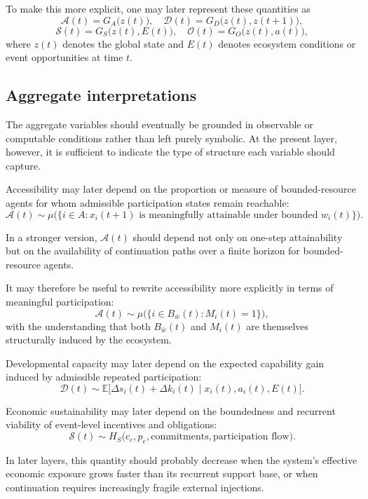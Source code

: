 \documentclass[11pt]{article}
\begin{document}
To make this more explicit, one may later represent these quantities as
\[
\mathcal{A}(t) = G_A\big(z(t)\big), \quad
\mathcal{D}(t) = G_D\big(z(t), z(t+1)\big),
\]
\[
\mathcal{S}(t) = G_S\big(z(t), E(t)\big), \quad
\mathcal{O}(t) = G_O\big(z(t), a(t)\big),
\]
where \(z(t)\) denotes the global state and \(E(t)\) denotes ecosystem conditions or event opportunities at time \(t\).

\subsection{Aggregate interpretations}

The aggregate variables should eventually be grounded in observable or computable conditions rather than left purely symbolic. At the present layer, however, it is sufficient to indicate the type of structure each variable should capture.

Accessibility may later depend on the proportion or measure of bounded-resource agents for whom admissible participation states remain reachable:
\[
\mathcal{A}(t) \sim \mu\big(\{i \in A : x_i(t+1) \text{ is meaningfully attainable under bounded } w_i(t)\}\big).
\]

In a stronger version, \(\mathcal{A}(t)\) should depend not only on one-step attainability but on the availability of continuation paths over a finite horizon for bounded-resource agents.

It may therefore be useful to rewrite accessibility more explicitly in terms of meaningful participation:
\[
\mathcal{A}(t) \sim \mu\big(\{ i \in B_{\bar{w}}(t) : M_i(t) = 1 \}\big),
\]
with the understanding that both \(B_{\bar{w}}(t)\) and \(M_i(t)\) are themselves structurally induced by the ecosystem.

Developmental capacity may later depend on the expected capability gain induced by admissible repeated participation:
\[
\mathcal{D}(t) \sim \mathbb{E}\big[\Delta s_i(t) + \Delta k_i(t) \mid x_i(t), a_i(t), E(t)\big].
\]

Economic sustainability may later depend on the boundedness and recurrent viability of event-level incentives and obligations:
\[
\mathcal{S}(t) \sim H_S\big(c_e, p_e, \text{commitments}, \text{participation flow}\big).
\]

In later layers, this quantity should probably decrease when the system's effective economic exposure grows faster than its recurrent support base, or when continuation requires increasingly fragile external injections.
\end{document}
